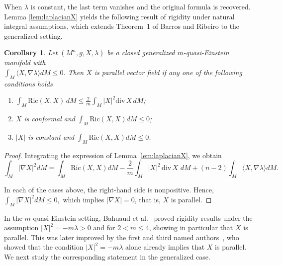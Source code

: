 \documentclass[a4paper, 12pt]{amsart}
\newtheorem{corollary}[theorem]{Corollary}
\theoremstyle{definition}
\numberwithin{figure}{section}
\begin{document}
When $\lambda$ is constant, the last term vanishes and the original formula is recovered. Lemma \ref{lem:laplacianX} yields the following result of rigidity under natural integral assumptions, which extends Theorem~1 of Barros and Ribeiro \cite{BarrosRibeiro2014} to the generalized setting.
\begin{corollary}
Let $(M^n,g,X,\lambda)$ be a closed generalized $m$-quasi-Einstein manifold with \\ $\int_M \langle X,\nabla \lambda\rangle dM \leq 0$. Then $X$ is parallel vector field if any one of the following conditions holds
\begin{enumerate}
\item $\displaystyle \int_M \mathrm{Ric}(X,X)\, dM 
\leq \frac{2}{m} \int_M |X|^2\mathrm{div}\,X \, dM$;

\item $X$ is conformal and $\displaystyle \int_M \mathrm{Ric}(X,X)dM\leq 0$;

\item $|X|$ is constant and $\displaystyle \int_M \mathrm{Ric}(X,X)dM\leq 0$.
\end{enumerate}
\end{corollary}

\begin{proof}
Integrating the expression of Lemma \ref{lem:laplacianX}, we obtain
\begin{equation*}
\int_M |\nabla X|^2 dM
= \int_M \mathrm{Ric}(X,X) dM
- \frac{2}{m}\int_M |X|^2 \,\mathrm{div}\,X \,\,dM
+(n-2)\int_M \langle X,\nabla \lambda\rangle dM.
\end{equation*}

In each of the cases above, the right-hand side is nonpositive. Hence,
$
\int_M |\nabla X|^2dM \leq 0,
$ 
which implies $|\nabla X|=0$, that is, $X$ is parallel.
\end{proof}

In the $m$-quasi-Einstein setting, Bahuaud et al.~\cite{Bahuaud2024} proved rigidity results under the assumption $|X|^2 = -m\lambda > 0$ and for $2 < m \leq 4$, showing in particular that $X$ is parallel. This was later improved by the first and third named authors~\cite{CarvalhoCosta}, who showed that the condition $|X|^2 = -m\lambda$ alone already implies that $X$ is parallel. We next study the corresponding statement in the generalized case.
\end{document}
